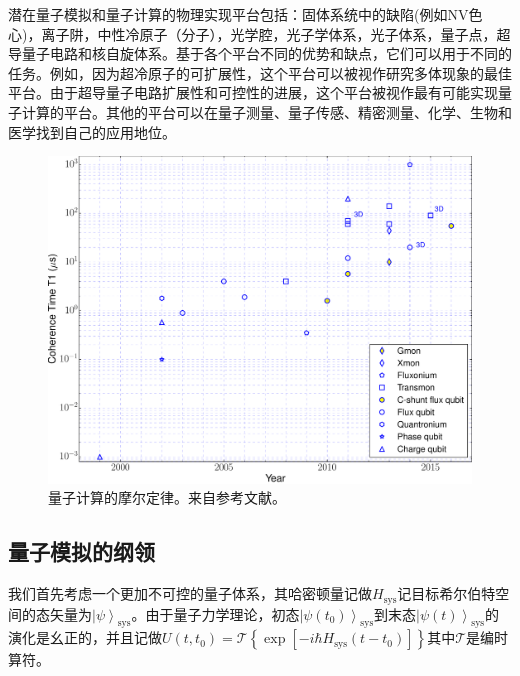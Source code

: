 \documentclass[supercite]{HustGraduPaper}
\newcommand{\ket}[1]{\left| #1 \right\rangle}
\begin{document}
  潜在量子模拟和量子计算的物理实现平台包括\cite{Georgescu2014}：固体系统中的缺陷(例如NV色心\cite{childress2006coherent})，离子阱\cite{leibfried2003quantum}，中性冷原子（分子）\cite{demille2002quantum}，光学腔\cite{imamog1999quantum}，光子学体系\cite{o2009photonic}，光子体系\cite{knill2001scheme}，量子点\cite{hanson2008coherent}，超导量子电路和核自旋体系。基于各个平台不同的优势和缺点，它们可以用于不同的任务。例如，因为超冷原子的可扩展性，这个平台可以被视作研究多体现象的最佳平台\cite{bloch2008many}。由于超导量子电路扩展性和可控性的进展，这个平台被视作最有可能实现量子计算的平台\cite{blais2004cavity}。其他的平台可以在量子测量\cite{giovannetti2006quantum}、量子传感\cite{degen2017quantum}、精密测量\cite{giovannetti2011advances}、化学\cite{lanyon2010towards}、生物\cite{wu2016diamond}和医学\cite{bailey2004quantum}找到自己的应用地位。
        \begin{figure}
  	\centering
  	\includegraphics[width=0.9\linewidth]{Figures/review/Moore}
  	\caption{量子计算的摩尔定律。来自参考文献\cite{GU20171}。}
  	\label{fig:moore}
  \end{figure} 
   
   \subsection{量子模拟的纲领}
   我们首先考虑一个更加不可控的量子体系，其哈密顿量记做$H_{\text{sys}}$记目标希尔伯特空间的态矢量为$\ket{\psi}_{\text{sys}}$。由于量子力学理论，初态$\ket{\psi(t_0)}_{\text{sys}}$到末态$\ket{\psi(t)}_{\text{sys}}$的演化是幺正的，并且记做$U\left( {t,{t_0}} \right) = \mathcal{T}\left\{ {\exp \left[ { - i\hbar {H_\text{sys}}\left( {t - {t_0}} \right)} \right]} \right\}$其中$\mathcal{T}$是编时算符。
   
\end{document}
